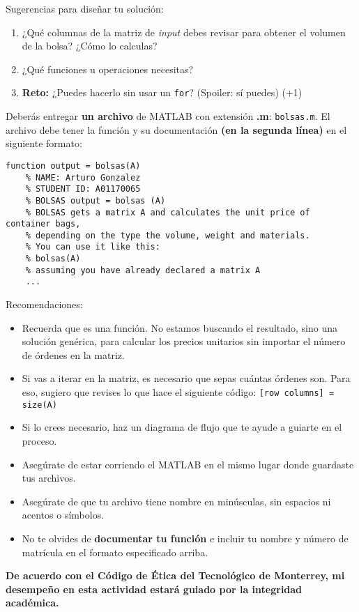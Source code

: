 \documentclass[]{book}
\newcommand{\matlab}[1]{\lstinline[style=Matlab-pyglike]!#1!}
\theoremstyle{definition}
\begin{document}
\bigskip

Sugerencias para diseñar tu solución:
\begin{enumerate}[label=\alph*)]
    \item ¿Qué columnas de la matriz de \textit{input} debes revisar para obtener el volumen de la bolsa? ¿Cómo lo calculas?
    \item ¿Qué funciones u operaciones necesitas?
    \item \textbf{Reto:} ¿Puedes hacerlo sin usar un \matlab{for}? (Spoiler: sí puedes) (+1)
\end{enumerate}

\pagebreak

Deberás entregar \textbf{un archivo} de MATLAB con extensión \textbf{.m}: \texttt{bolsas.m}.
El archivo debe tener la función y su documentación \textbf{(en la segunda línea)} en el siguiente formato:

\bigskip

\begin{lstlisting}[style=Matlab-editor]
    function output = bolsas(A)
    % NAME: Arturo Gonzalez
    % STUDENT ID: A01170065
    % BOLSAS output = bolsas (A)
    % BOLSAS gets a matrix A and calculates the unit price of container bags,
    % depending on the type the volume, weight and materials.
    % You can use it like this:
    % bolsas(A)
    % assuming you have already declared a matrix A
    ...
\end{lstlisting}

\bigskip

{\Large Recomendaciones:}

\begin{itemize}
    \item Recuerda que es una función. No estamos buscando el resultado, sino una solución genérica, para calcular los precios unitarios sin importar el número de órdenes en la matriz.
    \item Si vas a iterar en la matriz, es necesario que sepas cuántas órdenes son. Para eso, sugiero que revises lo que hace el siguiente código: \matlab{[row columns] = size(A)}
    \item Si lo crees necesario, haz un diagrama de flujo que te ayude a guiarte en el proceso.
    \item Asegúrate de estar corriendo el MATLAB en el mismo lugar donde guardaste tus archivos.
    \item Asegúrate de que tu archivo tiene nombre en minúsculas, sin espacios ni acentos o símbolos. 
    \item No te olvides de \textbf{documentar tu función} e incluir tu nombre y número de matrícula en el formato especificado arriba.
\end{itemize}

\vfill

\textbf{De acuerdo con el Código de Ética del Tecnológico de Monterrey, mi desempeño en esta actividad estará guiado por la integridad académica.}
\end{document}
